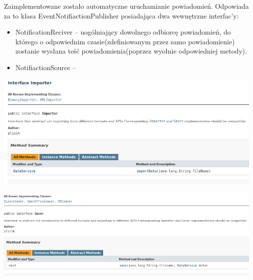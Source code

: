 \documentclass[a4paper,12pt]{article}
\begin{document}
Zaimplementowane zostało automatyczne uruchamianie powiadomień. Odpowiada za to klasa EventNotifiactionPublisher posiadająca dwa wewnętrzne interfac'y:
\begin{itemize}
\item NotificationReciver -- uogólniający dowolnego odbiorcę powiadomień, do którego o odpowiednim czasie(zdefiniowanym przez samo powiadomienie) zostanie wysłana teść powiadomienia(poprzez wyołnie odpowiedniej metody).
\item NotifiactionSource -- 
\end{itemize}



   

\begin{minipage}{\textwidth}

    \includegraphics[width=\textwidth]{./screen/logicLayer/Importer.png}
    \label{Importer}

\end{minipage}

\begin{minipage}{\textwidth}

    \includegraphics[width=\textwidth]{./screen/logicLayer/Saver.png}
    \label{Saver}

\end{minipage}
\end{document}
